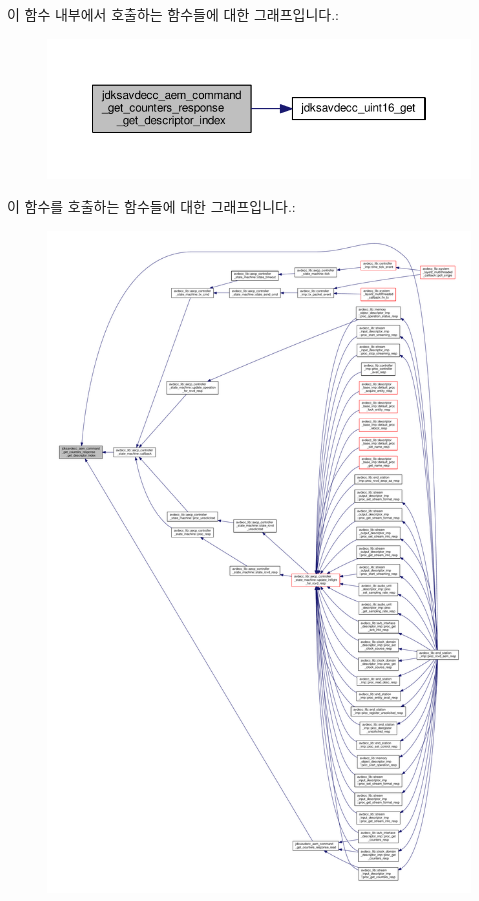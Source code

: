 이 함수 내부에서 호출하는 함수들에 대한 그래프입니다.\+:
\nopagebreak
\begin{figure}[H]
\begin{center}
\leavevmode
\includegraphics[width=350pt]{group__command__get__counters__response_gaa74bdfb514c2df95488fd804f59113e5_cgraph}
\end{center}
\end{figure}




이 함수를 호출하는 함수들에 대한 그래프입니다.\+:
\nopagebreak
\begin{figure}[H]
\begin{center}
\leavevmode
\includegraphics[width=350pt]{group__command__get__counters__response_gaa74bdfb514c2df95488fd804f59113e5_icgraph}
\end{center}
\end{figure}


